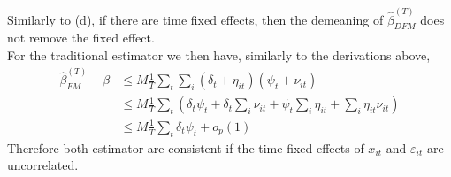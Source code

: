\documentclass[12pt,twoside]{article}
\begin{document}
\begin{enumerate}[label = (\alph*)]
    \begin{solution}
        Similarly to (d), if there are time fixed effects, then the demeaning of \(\widehat\beta^{(T)}_{DFM}\) does not remove the fixed effect. \\
        For the traditional estimator we then have, similarly to the derivations above,
        \begin{align*}
            \widehat\beta^{(T)}_{FM} - \beta & \leq M \frac{1}{T}\sum_t\sum_i \left(\delta_t+\eta_{it}\right)\left(\psi_t+\nu_{it}\right) \\
            & \leq M\frac{1}{T}\sum_t\left(\delta_t\psi_t + \delta_t\sum_i\nu_{it} + \psi_t\sum_i\eta_{it} + \sum_i\eta_{it}\nu_{it}\right) \\
            & \leq M\frac{1}{T}\sum_t \delta_t\psi_t + o_p(1)
        \end{align*}
        Therefore both estimator are consistent if the time fixed effects of \(x_{it}\) and \(\varepsilon_{it}\) are uncorrelated.
    \end{solution}


\end{enumerate}
\end{document}
